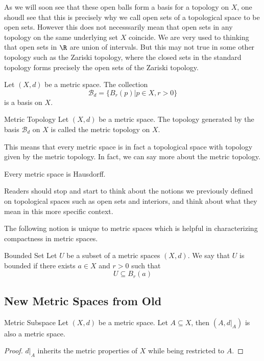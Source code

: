 As we will soon see that these open balls form a basis for a topology on $X$, one shoudl see that this is precisely why we call open sets of a topological space to be open sets. However this does not necesssarily mean that open sets in any topology on the same underlying set $X$ coincide. We are very used to thinking that open sets in $\R$ are union of intervals. But this may not true in some other topology such as the Zariski topology, where the closed sets in the standard topology forms precisely the open sets of the Zariski topology. 

\begin{prp}{}{} Let $(X,d)$ be a metric space. The collection $$\mathcal{B}_d=\{B_r(p)|p\in X,r>0\}$$ is a basis on $X$. 
\end{prp}

\begin{defn}{Metric Topology}{} Let $(X,d)$ be a metric space. The topology generated by the basis $\mathcal{B}_d$ on $X$ is called the metric topology on $X$. 
\end{defn}

This means that every metric space is in fact a topological space with topology given by the metric topology. In fact, we can say more about the metric topology. 

\begin{prp}{}{} Every metric space is Hausdorff. 
\end{prp}

Readers should stop and start to think about the notions we previously defined on topological spaces such as open sets and interiors, and think about what they mean in this more specific context. 

The following notion is unique to metric spaces which is helpful in characterizing compactness in metric spaces. 

\begin{defn}{Bounded Set}{} Let $U$ be a subset of a metric spaces $(X,d)$. We say that $U$ is bounded if there exists $a\in X$ and $r>0$ such that $$U\subseteq B_r(a)$$
\end{defn}

\subsection{New Metric Spaces from Old}
\begin{lmm}{Metric Subspace}{} Let $(X,d)$ be a metric space. Let $A\subseteq X$, then $(A,d|_A)$ is also a metric space. \tcbline
\begin{proof}
$d|_A$ inherits the metric properties of $X$ while being restricted to $A$. 
\end{proof}
\end{lmm}

